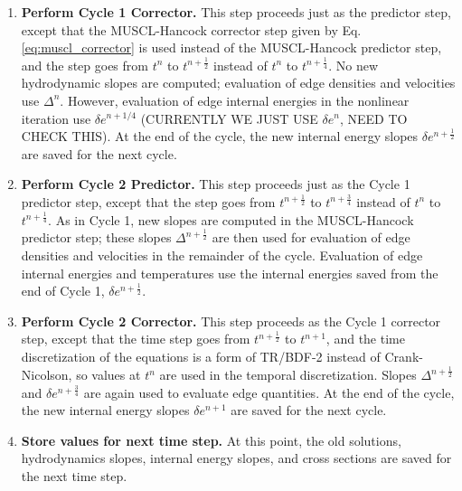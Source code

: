 \documentclass[preprint,12pt]{elsarticle}
\newcommand{\half}{\frac{1}{2}}
\newcommand{\fourth}{\frac{1}{4}}
\begin{document}
\begin{enumerate}
\begin{enumerate}
\begin{enumerate}
\end{enumerate}
\end{enumerate}


\item \textbf{Perform Cycle 1 Corrector.} This step proceeds
just as the predictor step, except that the MUSCL-Hancock
corrector step given by Eq. \eqref{eq:muscl_corrector} is used instead of the MUSCL-Hancock predictor
step, and the step goes from $t^n$ to $t^{n+\half}$ instead
of $t^n$ to $t^{n+\fourth}$. No new hydrodynamic slopes are computed;
evaluation of edge densities and velocities use
$\Delta^n$.  However, evaluation of edge internal energies
in the nonlinear iteration use $\delta e^{n+1/4}$ (CURRENTLY WE JUST USE $\delta
e^{n}$, NEED TO CHECK THIS). At the end
of the cycle, the new internal energy slopes $\delta e^{n+\half}$
are saved for the next cycle.


\item \textbf{Perform Cycle 2 Predictor.} This step proceeds
just as the Cycle 1 predictor step, except that the
step goes from $t^{n+\half}$ to $t^{n+\frac{3}{4}}$ instead
of $t^n$ to $t^{n+\fourth}$. As in Cycle 1, new slopes
are computed in the MUSCL-Hancock predictor step;
these slopes $\Delta^{n+\half}$ are then used for
evaluation of edge densities and velocities in the remainder
of the cycle. Evaluation of edge internal energies
and temperatures use the internal energies saved
from the end of Cycle 1, $\delta e^{n+\half}$.


\item \textbf{Perform Cycle 2 Corrector.} This step proceeds
as the Cycle 1 corrector step, except that the time step goes
from $t^{n+\half}$ to $t^{n+1}$, and the time discretization
of the equations is a form of TR/BDF-2
instead of Crank-Nicolson, so values at $t^n$
are used in the temporal discretization. Slopes
$\Delta^{n+\half}$ and $\delta e^{n+\frac{3}{4}}$  are again
used to evaluate edge quantities. At the end
of the cycle, the new internal energy slopes $\delta e^{n+1}$
are saved for the next cycle.


\item \textbf{Store values for next time step.}
At this point, the old solutions, hydrodynamics slopes,
internal energy slopes, and cross sections
are saved for the next time step.

\end{enumerate}
\end{document}
